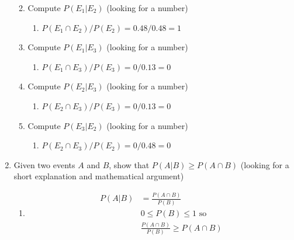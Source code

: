 \documentclass[krantz1,ChapterTOCs]{krantz}
\begin{document}
\begin{enumerate}
\begin{enumerate}
\begin{enumerate}
       \end{enumerate}
       \item Compute $P(E_{1} | E_{2})$ (looking for a number)
       \begin{enumerate}
           \item {\color{red} $P(E_{1} \cap E_{2} ) / P(E_{2}) = 0.48/0.48 = 1$     }
       \end{enumerate}
       \item Compute $P(E_{1} | E_{3})$ (looking for a number)
       \begin{enumerate}
           \item {\color{red}  $P(E_{1} \cap E_{3} ) / P(E_{3}) = 0/0.13 = 0$   }
       \end{enumerate}
       \item Compute $P(E_{2} | E_{3})$ (looking for a number)
       \begin{enumerate}
           \item {\color{red}  $P(E_{2} \cap E_{3} ) / P(E_{3}) = 0/0.13 = 0$   }
       \end{enumerate}
       \item Compute $P(E_{3} | E_{2})$ (looking for a number)
       \begin{enumerate}
           \item {\color{red}  $P(E_{2} \cap E_{3} ) / P(E_{2}) = 0/0.48 = 0$    }
       \end{enumerate}
   \end{enumerate}
   
   \item Given two events $A$ and $B$, show that $P(A|B) \geq P(A \cap B)$ (looking for a short explanation and mathematical argument)
   \begin{enumerate}
           \item {\color{red} 
           \begin{align}
               P(A|B) &= \frac{P(A \cap B)}{P(B)}\\
               & 0 \leq P(B) \leq 1 \text{ so }\\
               &\frac{P(A \cap B)}{P(B)} \geq P(A \cap B)
           \end{align}     }
       \end{enumerate}
   

\end{enumerate}
\end{document}
